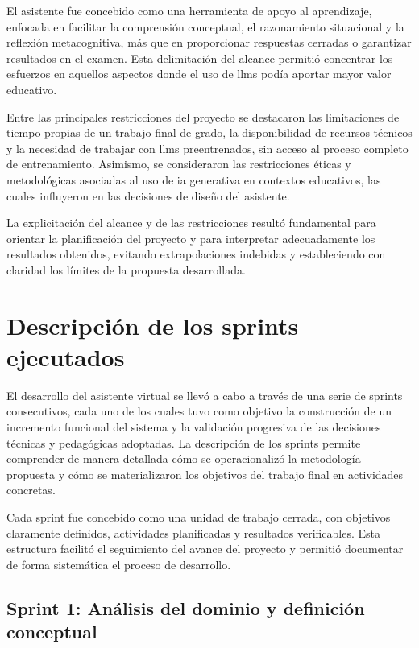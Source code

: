 El asistente fue concebido como una herramienta de apoyo al aprendizaje, enfocada en facilitar la comprensión conceptual, el razonamiento situacional y la reflexión metacognitiva, más que en proporcionar respuestas cerradas o garantizar resultados en el examen. Esta delimitación del alcance permitió concentrar los esfuerzos en aquellos aspectos donde el uso de \glspl{llm} podía aportar mayor valor educativo.

Entre las principales restricciones del proyecto se destacaron las limitaciones de tiempo propias de un trabajo final de grado, la disponibilidad de recursos técnicos y la necesidad de trabajar con \glspl{llm} preentrenados, sin acceso al proceso completo de entrenamiento. Asimismo, se consideraron las restricciones éticas y metodológicas asociadas al uso de \gls{ia} generativa en contextos educativos, las cuales influyeron en las decisiones de diseño del asistente.

La explicitación del alcance y de las restricciones resultó fundamental para orientar la planificación del proyecto y para interpretar adecuadamente los resultados obtenidos, evitando extrapolaciones indebidas y estableciendo con claridad los límites de la propuesta desarrollada.

\section{Descripción de los sprints ejecutados}

El desarrollo del asistente virtual se llevó a cabo a través de una serie de sprints consecutivos, cada uno de los cuales tuvo como objetivo la construcción de un incremento funcional del sistema y la validación progresiva de las decisiones técnicas y pedagógicas adoptadas. La descripción de los sprints permite comprender de manera detallada cómo se operacionalizó la metodología propuesta y cómo se materializaron los objetivos del trabajo final en actividades concretas.

Cada sprint fue concebido como una unidad de trabajo cerrada, con objetivos claramente definidos, actividades planificadas y resultados verificables. Esta estructura facilitó el seguimiento del avance del proyecto y permitió documentar de forma sistemática el proceso de desarrollo.

\subsection{Sprint 1: Análisis del dominio y definición conceptual}

